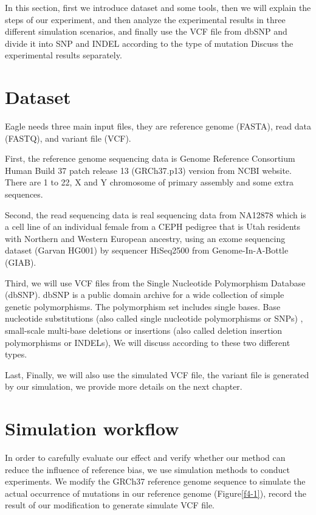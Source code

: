 \hspace{24pt}
In this section, first we introduce dataset and some tools, then we will explain the steps of our experiment, and then analyze the experimental results in three different simulation scenarios, and finally use the VCF file from dbSNP and divide it into SNP and INDEL according to the type of mutation Discuss the experimental results separately.

\section{Dataset}
Eagle needs three main input files, they are reference genome (FASTA), read data (FASTQ), and variant file (VCF). 

First, the reference genome sequencing data is Genome Reference Consortium Human Build 37 patch release 13 (GRCh37.p13) version from NCBI website. There are 1 to 22, X and Y chromosome of primary assembly and some extra sequences.

Second, the read sequencing data is real sequencing data from NA12878 which is a cell line of an individual female from a CEPH pedigree that is Utah residents with Northern and Western European ancestry, using an exome sequencing dataset (Garvan HG001) by sequencer HiSeq2500 from Genome-In-A-Bottle (GIAB).

Third, we will use VCF files from the Single Nucleotide Polymorphism Database (dbSNP). dbSNP is a public domain archive for a wide collection of simple genetic polymorphisms. The polymorphism set includes single bases. Base nucleotide substitutions (also called single nucleotide polymorphisms or SNPs) , small-scale multi-base deletions or insertions (also called deletion insertion polymorphisms or INDELs), We will discuss according to these two different types.

Last, Finally, we will also use the simulated VCF file, the variant file is generated by our simulation, we provide more details on the next chapter.

\section{Simulation workflow}
In order to carefully evaluate our effect and verify whether our method can reduce the influence of reference bias, we use simulation methods to conduct experiments. We modify the GRCh37 reference genome sequence to simulate the actual occurrence of mutations in our reference genome (Figure\ref{f4-1}), record the result of our modification to generate simulate VCF file.

